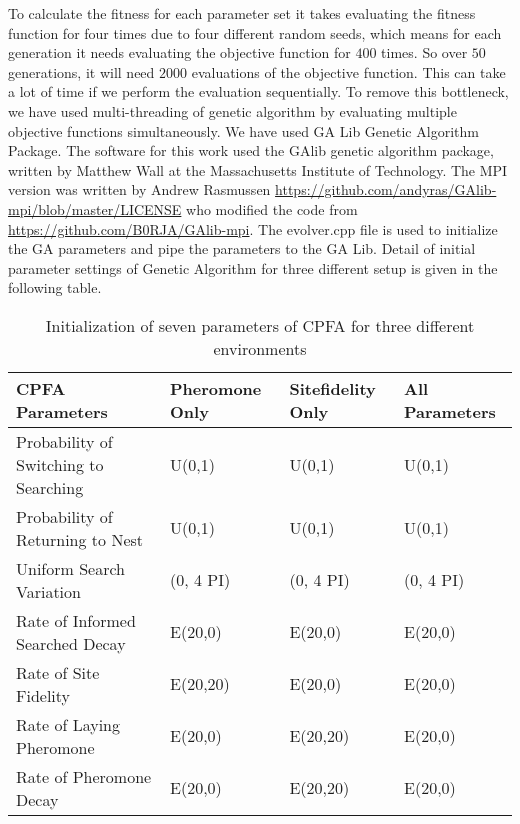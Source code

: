 To calculate the fitness for each parameter set it takes evaluating the fitness function for four times due to four different random seeds, which means for each generation it needs evaluating the objective function for $400$ times. So over $50$ generations, it will need $2000$ evaluations of the objective function. This can take a lot of time if we perform the evaluation sequentially. To remove this bottleneck, we have used multi-threading of genetic algorithm by evaluating multiple objective functions simultaneously. We have used GA Lib Genetic Algorithm Package. The software for this work used the GAlib genetic algorithm package, written by Matthew Wall at the Massachusetts Institute of Technology. The MPI version was written by Andrew Rasmussen \url{https://github.com/andyras/GAlib-mpi/blob/master/LICENSE} who modified the code from \url{https://github.com/B0RJA/GAlib-mpi}.
The evolver.cpp file is used to initialize the GA parameters and pipe the parameters to the GA Lib.
Detail of initial parameter settings of Genetic Algorithm for three different setup is given in the following table.
\begin{table}[h]
	\begin{tabular}{ |p{}|p{}|p{}|p{}| } 
		\hline
		\textbf{CPFA Parameters} & \textbf{Pheromone Only} & \textbf{Sitefidelity Only} & \textbf{All Parameters} \\
		\hline 
		Probability of Switching to Searching & U(0,1) & U(0,1) & U(0,1)\\ 
		\hline
		Probability of Returning to Nest & U(0,1) & U(0,1) & U(0,1)\\ 
		\hline
		Uniform Search Variation & (0, 4 PI) & (0, 4 PI) & (0, 4 PI)\\
		\hline
		Rate of Informed Searched Decay & E(20,0) & E(20,0) & E(20,0)\\
		\hline
		Rate of Site Fidelity & E(20,20) & E(20,0) & E(20,0)\\
		\hline
		Rate of Laying Pheromone & E(20,0) & E(20,20) & E(20,0)\\
		\hline
		Rate of Pheromone Decay & E(20,0) & E(20,20) & E(20,0)\\
		\hline
	\end{tabular}
	\caption{Initialization of seven parameters of CPFA for three different environments}
\end{table}
